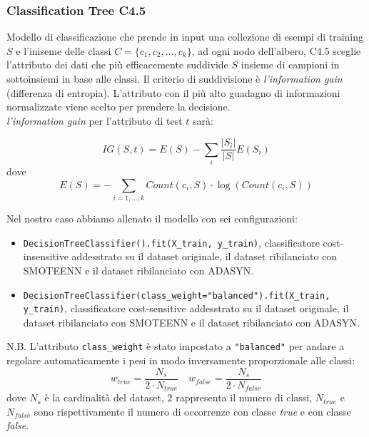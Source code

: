 \documentclass[italian,12pt,a4paper]{article}
\begin{document}
	\subsubsection{Classification Tree C4.5}
	Modello di classificazione che prende in input una collezione di esempi di training $S$ e l'iniseme delle classi $C = \{c_1, c_2, \dots, c_k\}$, ad ogni nodo dell'albero, C4.5 sceglie l'attributo dei dati che più efficacemente suddivide $S$ insieme di campioni in sottoinsiemi in base alle classi. Il criterio di suddivisione è \textit{l'information gain} (differenza di entropia). L'attributo con il più alto guadagno di informazioni normalizzate viene scelto per prendere la decisione. \\
	\textit{l'information gain} per l'attributo di test $t$ sarà:
	
	$$IG(S, t) = E(S) - \sum_i \frac{|S_i|}{|S|}E(S_i)$$ dove $$E(S) = -\sum_{i = 1, \dots, k} Count(c_i, S)\cdot\log(Count(c_i, S))$$
	
	Nel nostro caso abbiamo allenato il modello con sei configurazioni:
	
	\begin{itemize}
		\item \texttt{DecisionTreeClassifier().fit(X\_train, y\_train)}, classificatore cost-insensitive addesstrato su il dataset originale, il dataset ribilanciato con SMOTEENN e il dataset ribilanciato con ADASYN.
		\item \texttt{DecisionTreeClassifier(class\_weight="balanced").fit(X\_train, y\_train)}, classificatore cost-sensitive addesstrato su il dataset originale, il dataset ribilanciato con SMOTEENN e il dataset ribilanciato con ADASYN.
		
	\end{itemize}
	
	N.B. L'attributo \texttt{class\_weight} è stato impostato a \texttt{"balanced"} per andare a regolare automaticamente i pesi in modo inversamente proporzionale alle classi: $$w_{true} = \frac{N_s}{2\cdot N_{true}} \quad w_{false} = \frac{N_s}{2\cdot N_{false}} $$ dove $N_s$ è la cardinalità del dataset, $2$ rappresenta il numero di classi, $N_{true}$ e $N_{false}$ sono rispettivamente il numero di occorrenze con classe \textit{true} e con classe \textit{false}.
	
	
	
\end{document}
